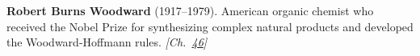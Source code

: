 \nobelchemistry \textbf{Robert Burns Woodward} (1917–1979). American organic chemist who received the Nobel Prize for synthesizing complex natural products and developed the Woodward-Hoffmann rules. \emph{[Ch.~\hyperref[ch:woodwardhoffmannrules]{46}]}

